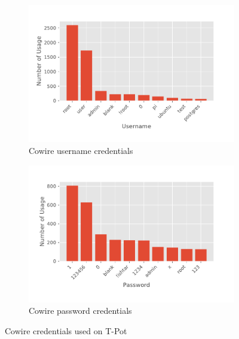 \begin{figure}
    \centering

    \begin{subfigure}[b]{0.49\textwidth}
        \centering
        \includegraphics[width=\textwidth]{figures/tpot-cowire-username.pdf}
        \caption{Cowire username credentials}
        \label{fig:tpot-cowire-username}
    \end{subfigure}
    \hfill
    \begin{subfigure}[b]{0.49\textwidth}
        \centering
        \includegraphics[width=\textwidth]{figures/tpot-cowire-password.pdf}
        \caption{Cowire password credentials}
        \label{fig:tpot-cowire-password}
    \end{subfigure}
    \caption[Cowire credentials on T-Pot]{Cowire credentials used on T-Pot}
    \label{fig:cowire-credentials}
\end{figure}


